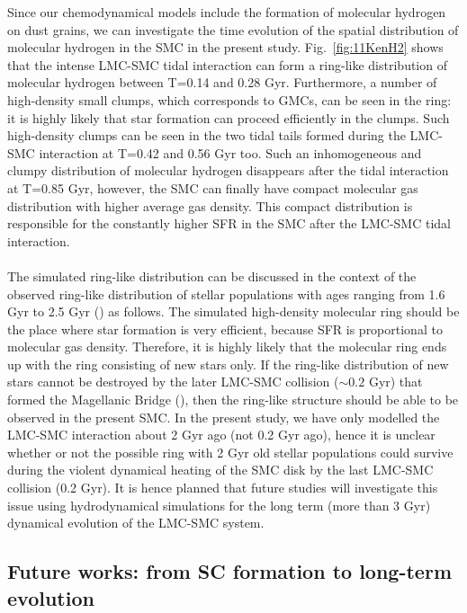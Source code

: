 \documentclass[fleqn,usenatbib]{mnras}
\begin{document}
Since our chemodynamical models include the formation of molecular hydrogen on dust grains, we can investigate the time evolution of the spatial distribution of molecular hydrogen in the SMC in the present study. Fig.~\ref{fig:11KenH2} shows that the intense LMC-SMC tidal interaction can form a ring-like distribution of molecular hydrogen between T=0.14 and 0.28 Gyr. Furthermore, a number of high-density small clumps, which corresponds to GMCs, can be seen in the ring: it is highly likely that star formation can proceed efficiently in the clumps. Such high-density clumps can be seen in the two tidal tails formed during the LMC-SMC interaction at T=0.42 and 0.56 Gyr too. Such an inhomogeneous
and clumpy distribution of molecular hydrogen disappears after the tidal interaction at T=0.85 Gyr, however, the SMC can finally have compact
molecular gas distribution with higher average gas density. This compact distribution is responsible for the constantly higher SFR in the SMC after the LMC-SMC tidal interaction.
\\
\\
The simulated ring-like distribution can be discussed in the context of the observed ring-like distribution of stellar populations with ages ranging from 1.6 Gyr to 2.5 Gyr (\citealt[HZ04]{20Harris_Zaritsky2004})
as follows. The simulated high-density molecular ring should be the place where star formation is very efficient, because SFR
is proportional to molecular gas density. Therefore, it is highly likely that the molecular ring ends up with the ring consisting of new stars only. If the ring-like distribution of new stars cannot be destroyed by the later LMC-SMC collision (${\sim}0.2$ Gyr) that formed the Magellanic Bridge (\citealt{K3_Diaz_Bekki2012}), then the ring-like structure should be able to be observed in the present SMC.
In the present study, we have only modelled the LMC-SMC interaction about 2 Gyr ago (not 0.2 Gyr ago), hence it is unclear whether or not the possible ring with 2 Gyr old stellar populations could survive during the violent dynamical heating of the SMC disk by the last LMC-SMC collision (0.2 Gyr). It is hence planned that future studies will investigate this issue using hydrodynamical simulations for the long term (more than 3 Gyr) dynamical evolution of the LMC-SMC system.


\subsection{Future works: from SC formation to
long-term evolution}
\end{document}
